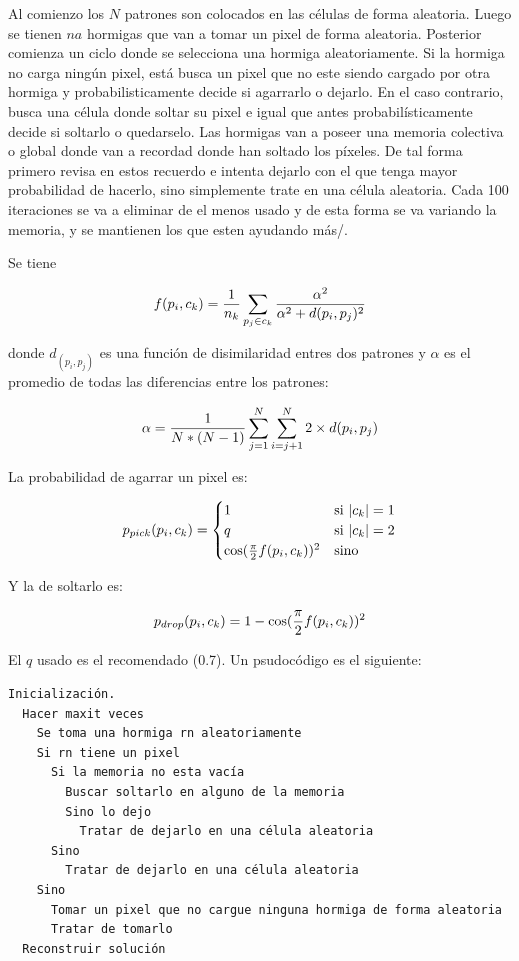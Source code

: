 Al comienzo los $N$ patrones son colocados
en las c\'elulas de forma aleatoria. Luego se tienen $na$ hormigas que van a tomar
un pixel de forma aleatoria. Posterior comienza un ciclo donde se selecciona una hormiga
aleatoriamente. Si la hormiga no carga ning\'un pixel, est\'a busca un pixel
que no este siendo cargado por otra hormiga y probabilisticamente decide si agarrarlo o dejarlo.
En el caso contrario, busca una c\'elula donde soltar su pixel e igual que antes
probabil\'isticamente decide si soltarlo o quedarselo. Las hormigas van a poseer
una memoria colectiva o global donde van a recordad donde han soltado los p\'ixeles.
De tal forma primero revisa en estos recuerdo e intenta dejarlo con el que tenga 
mayor probabilidad de hacerlo, sino simplemente trate en una c\'elula
aleatoria. Cada 100 iteraciones se va a eliminar de
el menos usado y de esta forma se va variando la memoria, y se mantienen los que
esten ayudando m\'as/.

Se tiene

\[
f(p_i,c_k) = {1 \over n_k} \sum_{p_j \in c_k} {\alpha^2 \over {\alpha^2 + d(p_i,p_j)^2}}
\]

donde $d_(p_i,p_j)$ es una funci\'on de disimilaridad
entres dos patrones y $\alpha$ es el promedio de todas
las diferencias entre los patrones:

\[
\alpha = {1 \over {N*(N-1)}} \sum_{j=1}^N \sum_{i=j+1}^N {2 \times d(p_i,p_j)}
\]

La probabilidad de agarrar un pixel es:

\[
p_{pick}(p_i,c_k) = 
\begin{cases}
1 & \text{si } |c_k| = 1 \\
q & \text{si } |c_k| = 2 \\
\cos( {\pi \over 2} f(p_i, c_k) )^2  & \text {sino}
\end{cases}
\]

Y la de soltarlo es:

\[
p_{drop}(p_i,c_k) = 1 - \cos( {\pi \over 2} f(p_i, c_k) )^2 
\]

El $q$ usado es el recomendado (0.7). Un psudoc\'odigo es
el siguiente:

\begin{lstlisting}[mathescape, language=Pascal]
  Inicialización.
  Hacer maxit veces
    Se toma una hormiga rn aleatoriamente
	Si rn tiene un pixel
	  Si la memoria no esta vacía
	    Buscar soltarlo en alguno de la memoria
		Sino lo dejo
		  Tratar de dejarlo en una célula aleatoria
	  Sino
	    Tratar de dejarlo en una célula aleatoria
	Sino
	  Tomar un pixel que no cargue ninguna hormiga de forma aleatoria
	  Tratar de tomarlo
  Reconstruir solución
\end{lstlisting}

